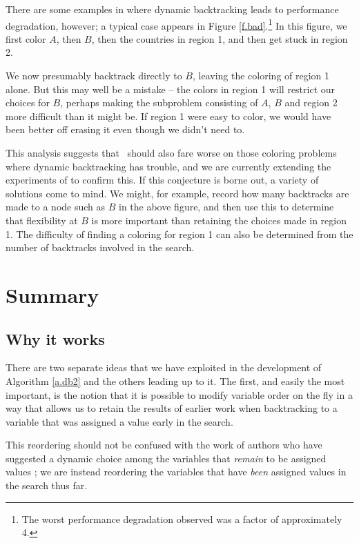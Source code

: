 There are some examples in \cite{Jonsson:experiment} where dynamic
backtracking leads to performance degradation, however; a typical case
appears in Figure \ref{f.bad}.\footnote{The worst performance
degradation observed was a factor of approximately 4.} In this figure,
we first color $A$, then $B$, then the countries in region 1, and then
get stuck in region 2.

We now presumably backtrack directly to $B$, leaving the coloring of
region 1 alone.  But this may well be a mistake -- the colors in
region 1 will restrict our choices for $B$, perhaps making the
subproblem consisting of $A$, $B$ and region 2 more difficult than it
might be.  If region 1 were easy to color, we would have been better
off erasing it even though we didn't need to.

This analysis suggests that \ddb\ should also fare worse on those
coloring problems where dynamic backtracking has trouble, and we are
currently extending the experiments of \cite{Jonsson:experiment} to
confirm this.  If this conjecture is borne out, a variety of solutions
come to mind.  We might, for example, record how many backtracks are
made to a node such as $B$ in the above figure, and then use this to
determine that flexibility at $B$ is more important than retaining the
choices made in region 1.  The difficulty of finding a coloring for
region 1 can also be determined from the number of backtracks involved
in the search.

\section{Summary}
\label{s.summary}

\subsection{Why it works}

There are two separate ideas that we have exploited in the development
of Algorithm \ref{a.db2} and the others leading up to it.  The first,
and easily the most important, is the notion that it is possible to
modify variable order on the fly in a way that allows us to retain the
results of earlier work when backtracking to a variable that was
assigned a value early in the search.

This reordering should not be confused with the work of authors who
have suggested a dynamic choice among the variables that {\em
remain\/} to be assigned values
\cite{Dechter:experiment,Ginsberg:xw,Purdom:dynamic,Zabih:dynamic}; we
are instead reordering the variables that have {\em been\/} assigned
values in the search thus far.

